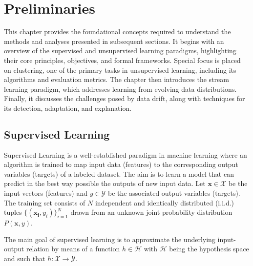 \chapter{Preliminaries}\label{ch:preliminaries}

This chapter provides the foundational concepts required to understand the
methods and analyses presented in subsequent sections. It begins with an
overview of the supervised and unsupervised learning paradigms, highlighting
their core principles, objectives, and formal frameworks. Special focus is
placed on clustering, one of the primary tasks in unsupervised learning,
including its algorithms and evaluation metrics. The chapter then introduces
the stream learning paradigm, which addresses learning from evolving data
distributions. Finally, it discusses the challenges posed by data drift, along
with techniques for its detection, adaptation, and explanation.

\section{Supervised Learning}\label{sec:supervised_leaning}
Supervised Learning is a well-established paradigm in machine learning where an
algorithm is trained to map input data (features) to the corresponding output
variables (targets) of a labeled dataset. The aim is to learn a model that can
predict in the best way possible the outputs of new input data. Let $\mathbf{x}
    \in \mathcal{X}$ be the input vectors (features) and $ y \in \mathcal{Y}$ be
the associated output variables (targets). The training set consists of $N$
independent and identically distributed (i.i.d.) tuples $\{(\mathbf{x_i},
    y_i)\}^N_{i=1}$ drawn from an unknown joint probability distribution
$P(\mathbf{x},y)$.

The main goal of supervised learning is to approximate the underlying
input-output relation by means of a function $h \in \mathcal{H}$ with
$\mathcal{H}$ being the hypothesis space and such that $h: \mathcal{X}
    \rightarrow \mathcal{Y}$.

